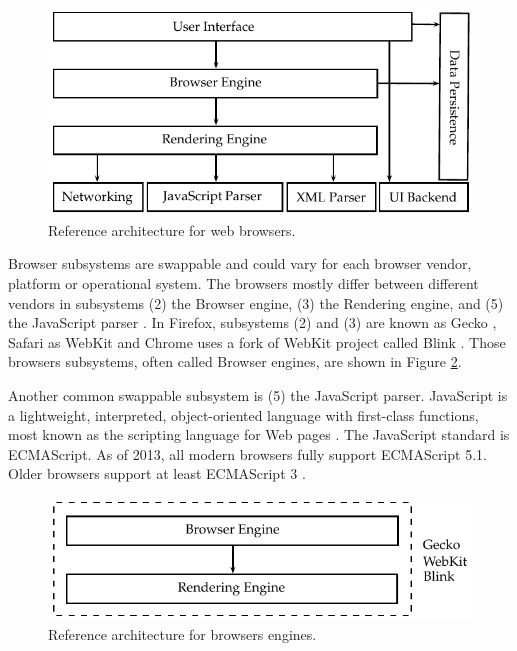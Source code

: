 \begin{figure}[!htb]
  \centering
  \includegraphics{chapters/basic_concepts/web_architecture.pdf}
  \caption{Reference architecture for web browsers.}
  \label{figure:web_architecture}
\end{figure}

Browser subsystems are swappable \cite{Grosskurth2005} and could vary for each browser vendor, platform or operational system. The browsers mostly differ between different vendors in subsystems (2) the Browser engine, (3) the Rendering engine, and (5) the JavaScript parser  \cite{Firefox2013,Safari2013,WebKit2013,Chrome2010}. In Firefox, subsystems (2) and (3) are known as Gecko \cite{Firefox2013,Gecko2013}, Safari as WebKit \cite{Safari2013,WebKit2013} and Chrome uses a fork of WebKit project called Blink \cite{Chrome2010,Blink2013}. Those browsers subsystems, often called Browser engines, are shown in Figure \ref{figure:web_architecture_engines}.

Another common swappable subsystem is (5) the JavaScript parser. JavaScript \cite{International2009} is a lightweight, interpreted, object-oriented language with first-class functions, most known as the scripting language for Web pages \cite{Gecko2013}. The JavaScript standard is ECMAScript. As of 2013, all modern browsers fully support ECMAScript 5.1. Older browsers support at least ECMAScript 3 \cite{Gecko2013,International2009}.

\begin{figure}[!htb]
  \centering
  \includegraphics{chapters/basic_concepts/web_architecture_engines.pdf}
  \caption{Reference architecture for browsers engines.}
  \label{figure:web_architecture_engines}
\end{figure}

